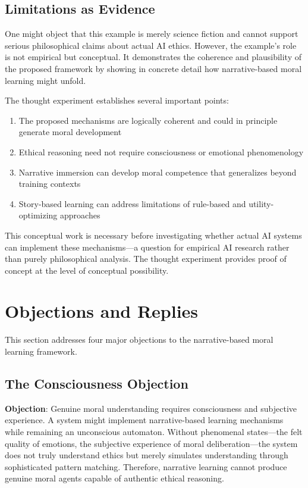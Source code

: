 \documentclass[12pt]{article}
\begin{document}
\subsection{Limitations as Evidence}

One might object that this example is merely science fiction and cannot support serious philosophical claims about actual AI ethics. However, the example's role is not empirical but conceptual. It demonstrates the coherence and plausibility of the proposed framework by showing in concrete detail how narrative-based moral learning might unfold.

The thought experiment establishes several important points:

\begin{enumerate}
\item The proposed mechanisms are logically coherent and could in principle generate moral development
\item Ethical reasoning need not require consciousness or emotional phenomenology
\item Narrative immersion can develop moral competence that generalizes beyond training contexts
\item Story-based learning can address limitations of rule-based and utility-optimizing approaches
\end{enumerate}

This conceptual work is necessary before investigating whether actual AI systems can implement these mechanisms---a question for empirical AI research rather than purely philosophical analysis. The thought experiment provides proof of concept at the level of conceptual possibility.

\section{Objections and Replies}

This section addresses four major objections to the narrative-based moral learning framework.

\subsection{The Consciousness Objection}

\textbf{Objection}: Genuine moral understanding requires consciousness and subjective experience. A system might implement narrative-based learning mechanisms while remaining an unconscious automaton. Without phenomenal states---the felt quality of emotions, the subjective experience of moral deliberation---the system does not truly understand ethics but merely simulates understanding through sophisticated pattern matching. Therefore, narrative learning cannot produce genuine moral agents capable of authentic ethical reasoning.
\end{document}
